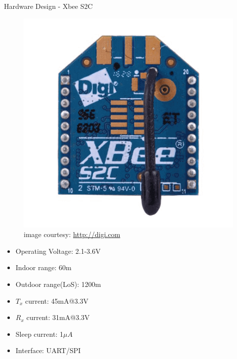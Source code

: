 \documentclass[t]{beamer} %
\begin{document}
\begin{frame}{Hardware Design - Xbee S2C}
\fboxsep=0pt
\noindent
\begin{minipage}[t]{0.48\linewidth}
\begin{figure}[!ht]
	\centering
\includegraphics[scale=0.3]{XBee}
\caption{\tiny image courtesy: \url{http://digi.com}}
\label{fig:xbee S2C}
\end{figure}
\end{minipage}
\hfill
\begin{minipage}[t]{0.48\linewidth}
\begin{itemize}
\item Operating Voltage: 2.1-3.6V
\item Indoor range: 60m
\item Outdoor range(LoS): 1200m
\item $T_x$ current: 45mA@3.3V
\item $R_x$ current: 31mA@3.3V
\item Sleep current: 1$\mu A$ 
\item Interface: UART/SPI
\end{itemize}
\end{minipage}
\end{frame}
\end{document}
